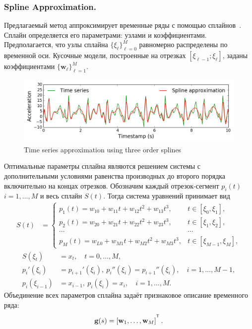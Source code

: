\subsubsection{Spline Approximation.}
Предлагаемый метод аппроксимирует временные ряды с помощью сплайнов~\cite{deboor1978splines}. Сплайн определяется его параметрами: узлами и коэффициентами.
Предполагается, что узлы сплайна $\{\xi_\ell\}_{\ell=0}^M$ равномерно распределены по временной оси.
Кусочные модели, построенные на отрезках $[\xi_{\ell-1}; \xi_{\ell}]$, заданы коэффициентами $\{\mathbf{w}_\ell\}_{\ell=1}^{M}$.
\begin{figure}[h]
	\centering
	\includegraphics[width=1\linewidth]{figs/ch5/spline_example.png}
	\caption{Time series approximation using three order splines}
	\label{fig::spline_example}
\end{figure}
Оптимальные параметры сплайна являются решением системы с дополнительными условиями равенства производных до второго порядка включительно на концах отрезков.
Обозначим каждый отрезок-сегмент $p_i(t)$ $i = 1, \dots, M$ и весь сплайн $S(t)$. Тогда система уравнений принимает вид
\begin{align*}
S(t) &= \begin{cases}
p_1(t) = w_{10} +w_{11}t + w_{12}t^2 + w_{13}t^3, & t\in [\xi_0, \xi_1],\\
p_2(t) = w_{20} +w_{21}t + w_{22}t^2 + w_{23}t^3, & t\in [\xi_1, \xi_2],\\
\cdots&\cdots \\
p_{M}(t) = w_{L0} +w_{M1}t + w_{M2}t^2 + w_{M3}t^3, & t\in [\xi_{M-1}, \xi_M],					
\end{cases}
\end{align*}
\begin{align*}
S(\xi_t) &= x_t, \quad t = 0, \dots, M,\\
p_i'(\xi_i) &= p_{i+1}'(\xi_i),\: p_i''(\xi_i) = p_{i+1}''(\xi_i), \quad i = 1, \dots, M-1,\\
p_i(\xi_{i-1}) &= x_{i-1},\: p_i(\xi_i) = x_i, \quad i = 1, \dots, M.
\end{align*}
Объединение всех параметров сплайна задаёт признаковое описание временного ряда:
\[
\mathbf{g}(s) = \left[\mathbf{w}_1, \dots, \mathbf{w}_{M}\right]^{\T}.
\]

